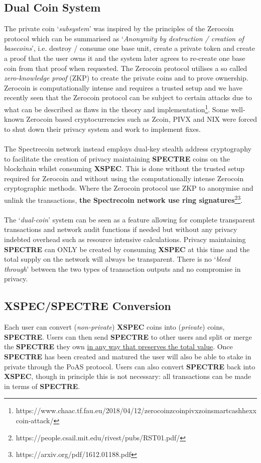 \subsection{Dual Coin System}
The private coin ‘\textit{subsystem}’ was inspired by the principles of the Zerocoin
protocol which can be summarised as ‘\textit{Anonymity by destruction / creation of
basecoins}’, i.e. destroy / consume one base unit, create a private token
and create a proof that the user owns it and the system later agrees to
re-create one base coin from that proof when requested. The Zerocoin protocol
utilises a so called \textit{zero-knowledge proof} (ZKP) to create the private coins
and to prove ownership. Zerocoin is computationally intense and requires a
trusted setup and we have recently seen that the Zerocoin protocol can be
subject to certain attacks due to what can be described as flaws in the
theory and 
implementation\footnote{https://www.chaac.tf.fau.eu/2018/04/12/zerocoinzcoinpivxzoinsmartcashhexxcoin-attack/}. 
Some well-known Zerocoin based cryptocurrencies
such as Zcoin, PIVX and NIX were forced to shut down their privacy system and
work to implement fixes.
\\
\\
\noindent
The Spectrecoin network instead employs dual-key stealth address cryptography
to facilitate the creation of privacy maintaining \textbf{SPECTRE} coins on the
blockchain whilst consuming \textbf{XSPEC}. This is done without the trusted setup
required for Zerocoin and without using the computationally intense Zerocoin
cryptographic methods. Where the Zerocoin protocol use ZKP to anonymise and
unlink the transactions, 
\textbf{the Spectrecoin network use ring signatures}\footnote{https://people.csail.mit.edu/rivest/pubs/RST01.pdf/}\footnote{https://arxiv.org/pdf/1612.01188.pdf}.
\\
\\
\noindent
The ‘\textit{dual-coin}’ system can be seen as a feature allowing for complete
transparent transactions and network audit functions if needed but
without any privacy indebted overhead such as resource intensive
calculations. Privacy maintaining \textbf{SPECTRE} can ONLY be created by
consuming \textbf{XSPEC} at this time and the total supply on the network
will always be transparent. There is no ‘\textit{bleed through}’ between the
two types of transaction outputs and no compromise in privacy.
\newpage


\subsection{XSPEC/SPECTRE Conversion}
Each user can convert (\textit{non-private}) \textbf{XSPEC} coins into 
(\textit{private}) coins, \textbf{SPECTRE}. Users can then send \textbf{SPECTRE} 
to other users and split or merge the \textbf{SPECTRE} they own \underline{in any 
way that preserves the total value}. Once \textbf{SPECTRE} has been created
and matured the user will also be able to stake in private through the PoAS
protocol. Users can also convert \textbf{SPECTRE} back into \textbf{XSPEC}, 
though in principle this is not necessary: all transactions can be made in 
terms of \textbf{SPECTRE}.



